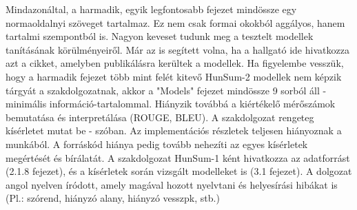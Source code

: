 \documentclass[a4paper,12pt]{article}
\begin{document}
Mindazonáltal, a harmadik, egyik legfontosabb fejezet mindössze egy normaoldalnyi szöveget tartalmaz. Ez nem csak formai okokból aggályos, hanem tartalmi szempontból is. Nagyon keveset tudunk meg a tesztelt modellek tanításának körülményeiről. Már az is segített volna, ha a hallgató ide hivatkozza azt a cikket, amelyben publikálásra kerültek a modellek. Ha figyelembe vesszük, hogy a harmadik fejezet több mint felét kitevő HunSum-2 modellek nem képzik tárgyát a szakdolgozatnak, akkor a "Models" fejezet mindössze 9 sorból áll - minimális információ-tartalommal. Hiányzik továbbá a kiértékelő mérőszámok bemutatása és interpretálása (ROUGE, BLEU).
A szakdolgozat rengeteg kísérletet mutat be - szóban. Az implementációs részletek teljesen hiányoznak a munkából. A forráskód hiánya pedig tovább nehezíti az egyes kísérletek megértését és bírálatát.
A szakdolgozat HunSum-1 ként hivatkozza az adatforrást (2.1.8 fejezet), és a kísérletek során vizsgált modelleket is (3.1 fejezet).
A dolgozat angol nyelven íródott, amely magával hozott nyelvtani és helyesírási hibákat is (Pl.: szórend, hiányzó alany, hiányzó vesszpk, stb.)








\end{document}
